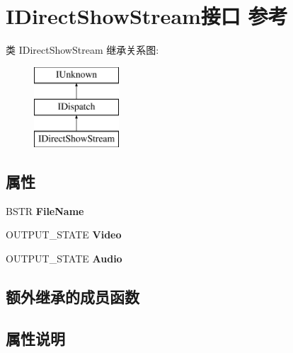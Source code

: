 \hypertarget{interface_i_direct_show_stream}{}\section{I\+Direct\+Show\+Stream接口 参考}
\label{interface_i_direct_show_stream}
类 I\+Direct\+Show\+Stream 继承关系图\+:\begin{figure}[H]
\begin{center}
\leavevmode
\includegraphics[height=3.000000cm]{interface_i_direct_show_stream}
\end{center}
\end{figure}
\subsection*{属性}
\begin{DoxyCompactItemize}
\item 
B\+S\+TR {\bfseries File\+Name}
\item 
O\+U\+T\+P\+U\+T\+\_\+\+S\+T\+A\+TE {\bfseries Video}
\item 
O\+U\+T\+P\+U\+T\+\_\+\+S\+T\+A\+TE {\bfseries Audio}
\end{DoxyCompactItemize}
\subsection*{额外继承的成员函数}


\subsection{属性说明}
\mbox{\label{interface_i_direct_show_stream_a7a3b34d70087d940e5c608e35294f819}} 
